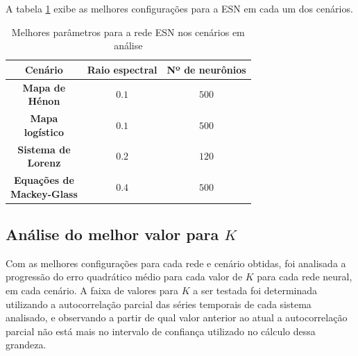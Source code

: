 \documentclass{article}
\begin{document}
A tabela \ref{tab:esn} exibe as melhores configurações para a ESN em cada um dos cenários.
\begin{table}[!ht]
\begin{center}
\begin{tabular}{c c c}
  \textbf{Cenário} & {\centering \textbf{Raio espectral}} & {\centering \textbf{Nº de neurônios}}\\
 \hline
 \addlinespace
 \pbox{0.7cm}{\centering \textbf{Mapa de\newline Hénon}} & $0.1$ & $500$\\  
  \addlinespace
 \pbox{0.7cm}{\centering \textbf{Mapa\newline logístico}} & $0.1$ & $500$\\ 
  \addlinespace
 \pbox{0.9cm}{\centering \textbf{Sistema de\newline Lorenz}} & $0.2$ & $120$\\ 
  \addlinespace
 \pbox{0.929cm}{\centering \textbf{Equações de\newline Mackey-Glass}} & $0.4$ & $500$\\ 
\end{tabular}
\caption{Melhores parâmetros para a rede ESN nos cenários em análise}
\label{tab:esn}
\end{center}
\end{table}

\subsection{Análise do melhor valor para $K$}

Com as melhores configurações para cada rede e cenário obtidas, foi analisada a progressão do erro quadrático médio para cada valor de $K$ para cada rede neural, em cada cenário. A faixa de valores para $K$ a ser testada foi determinada utilizando a autocorrelação parcial das séries temporais de cada sistema analisado, e observando a partir de qual valor anterior ao atual a autocorrelação parcial não está mais no intervalo de confiança utilizado no cálculo dessa grandeza.
\end{document}
